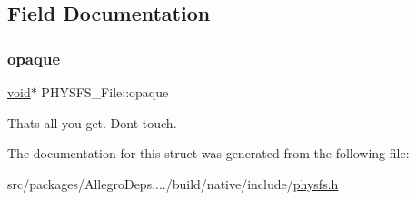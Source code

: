 \subsection{Field Documentation}
\mbox{\label{struct_p_h_y_s_f_s___file_a594c10e8f0537c4f2cd8f58f5bc8a748}} 
\subsubsection{\texorpdfstring{opaque}{opaque}}
{\footnotesize\ttfamily \hyperlink{png_8h_ac9c84fa68bbad002983e35ce3663c686}{void}$\ast$ P\+H\+Y\+S\+F\+S\+\_\+\+File\+::opaque}

That\textquotesingle{}s all you get. Don\textquotesingle{}t touch. 

The documentation for this struct was generated from the following file\+:\begin{DoxyCompactItemize}
\item 
src/packages/\+Allegro\+Deps..../build/native/include/\hyperlink{physfs_8h}{physfs.\+h}\end{DoxyCompactItemize}
